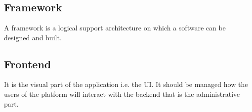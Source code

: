 \section{}


\subsection*{Framework}
A framework is a logical support architecture on which a software can be designed and built. 
\subsection*{Frontend}
It is the visual part of the application i.e. the UI. It should be managed how the users of the platform will interact with the backend that is the administrative part. 